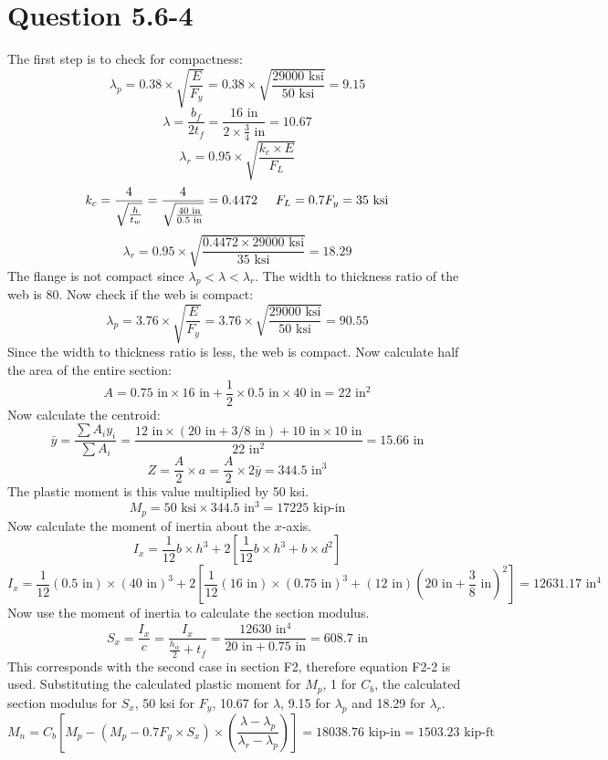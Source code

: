 \documentclass{article}
\begin{document}
\section*{Question 5.6-4}
The first step is to check for compactness: 
\[\lambda_p=0.38\times\sqrt{\frac{E}{F_y}}=0.38\times\sqrt{\frac{29000 \text{ ksi}}{50\text{ ksi}}}=9.15\] 
\[\lambda =\frac{b_f}{2t_f}=\frac{16\text{ in}}{2\times \frac{3}{4}\text{ in}}=10.67\] 
\[\lambda_r=0.95\times \sqrt{\frac{k_c\times E}{F_L}}\]
\[k_c=\frac{4}{\sqrt{\frac{h}{t_w}}}=\frac{4}{\sqrt{\frac{40\text{ in}}{0.5\text{ in}}}}=0.4472\hspace{5mm}F_L=0.7F_y=35\text{ ksi}\] 
\[\lambda_r=0.95\times \sqrt{\frac{0.4472\times 29000\text{ ksi}}{35\text{ ksi}}}=18.29\] 
The flange is not compact since $\lambda_p<\lambda<\lambda_r$. The width to thickness ratio of the web is 80. Now check if the web is compact: 
\[\lambda_p=3.76\times \sqrt{\frac{E}{F_y}}=3.76\times\sqrt{\frac{29000 \text{ ksi}}{50\text{ ksi}}}=90.55\] 
Since the width to thickness ratio is less, the web is compact. Now calculate half the area of the entire section: 
\[A=0.75\text{ in}\times 16\text{ in}+\frac{1}{2}\times 0.5\text{ in}\times 40\text{ in}=22\text{ in}^2\] 
Now calculate the centroid: 
\[\bar{y}=\frac{\sum A_iy_i}{\sum A_i}=\frac{12\text{ in}\times (20\text{ in}+3/8\text{ in})+10\text{ in}\times 10\text{ in}}{22\text{ in}^2}=15.66\text{ in}\]
\[Z=\frac{A}{2}\times a = \frac{A}{2}\times 2\bar{y} = 344.5\text{ in}^3\]
The plastic moment is this value multiplied by 50 ksi. 
\[M_p=50\text{ ksi}\times 344.5\text{ in}^3=17225\text{ kip-in}\]
Now calculate the moment of inertia about the $x$-axis. 
\[I_x=\frac{1}{12}b\times h^3+ 2\left[\frac{1}{12}b\times h^3+b\times d^2\right]\]
\[I_x=\frac{1}{12}(0.5\text{ in})\times (40\text{ in})^3+2\left[\frac{1}{12}(16\text{ in})\times (0.75\text{ in})^3+(\text{12 in})\left(20\text{ in} + \frac{3}{8}\text{ in}\right)^2\right]=12631.17\text{ in}^4\]
Now use the moment of inertia to calculate the section modulus.
\[S_x=\frac{I_x}{c}=\frac{I_x}{\frac{h_w}{2}+t_f}=\frac{12630\text{ in}^4}{20\text{ in}+0.75\text{ in}}=608.7\text{ in}\]
This corresponds with the second case in section F2, therefore equation F2-2 is used. Substituting the calculated plastic moment for $M_p$, 1 for $C_b$, the calculated section modulus for $S_x$, 50 ksi for $F_y$, 10.67 for $\lambda$, 9.15 for $\lambda_p$ and 18.29 for $\lambda_r$.
\[M_n=C_b\left[M_p-(M_p-0.7F_y\times S_x)\times\left(\frac{\lambda-\lambda_p}{\lambda_r-\lambda_p}\right)\right]=18038.76\text{ kip-in}=\boxed{1503.23\text{ kip-ft}}\]
\end{document}
